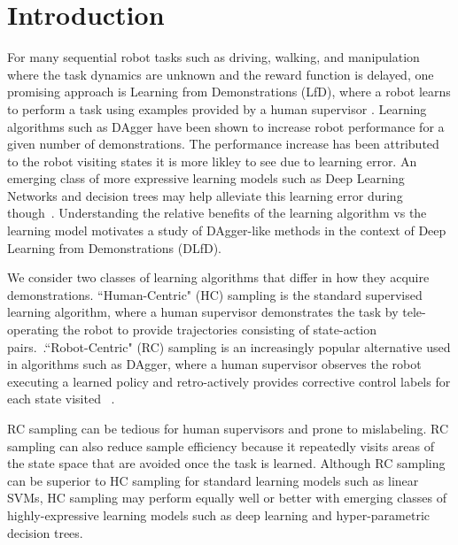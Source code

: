 \documentclass[10pt, conference]{ieeeconf}      %
\begin{document}
\section{Introduction} 
For many sequential robot tasks such as driving, walking, and manipulation where the task dynamics are unknown and the reward function is delayed, one promising approach is Learning from Demonstrations (LfD), where a robot learns to perform a task using examples provided by a human supervisor \cite{pomerleau1989alvinn,abbeel2008apprenticeship,argall2009survey,ross2010reduction,laskeyshiv}.  Learning algorithms such as DAgger have been shown to increase robot performance for a given number of demonstrations. The performance increase has been attributed to the robot visiting states it is more likley to see due to learning error.  An emerging class of more expressive learning models such as Deep Learning Networks and decision trees may help alleviate this learning error during though~\cite{levine2015end}.  Understanding the relative benefits of the learning algorithm vs the learning model motivates a study of DAgger-like methods in the context of Deep Learning from Demonstrations (DLfD).

We consider two classes of learning algorithms that differ in how they acquire demonstrations. ``Human-Centric" (HC) sampling is the standard supervised learning algorithm, where a human supervisor demonstrates the task by tele-operating the robot to provide trajectories consisting of state-action pairs.~\cite{argall2009survey}.``Robot-Centric" (RC) sampling is an increasingly popular alternative used in algorithms such as DAgger, where a human supervisor observes the robot executing a learned policy and retro-actively provides corrective control labels for each state visited ~\cite{ross2010efficient,ross2010reduction,laskeyrobot,laskeyshiv,he2012imitation}.  

RC sampling can be tedious for human supervisors and prone to mislabeling.  RC sampling can also reduce sample efficiency because it repeatedly visits areas of the state space that are avoided once the task is learned. Although RC sampling can be superior to HC sampling for standard learning models such as linear SVMs, HC sampling may perform equally well or better with emerging classes of highly-expressive learning models such as deep learning and hyper-parametric decision trees.
\end{document}
